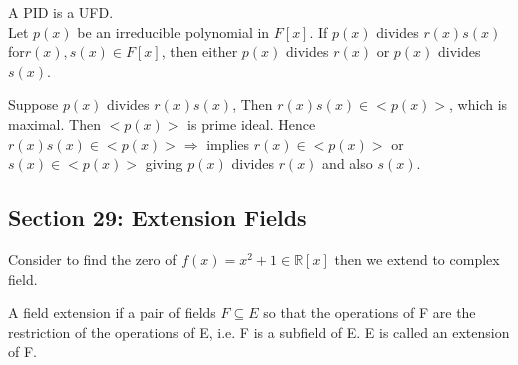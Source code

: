 \documentclass{article}
\newcommand\R{\ensuremath{\mathbb{R}}}
\begin{document}
\begin{theorem}
    A PID is a UFD.
\\ Let $p(x)$ be an irreducible polynomial in $F[x]$. If $p(x)$ divides $r(x)s(x)$ for$r(x), s(x) \in F[x]$, then either $p(x)$ divides $r(x)$ or $p(x)$ divides $s(x)$.
\end{theorem}

\begin{Proof}
    Suppose $p(x)$ divides $r(x)s(x)$, Then $r(x)s(x)\in <p(x)>$, which is maximal. Then $<p(x)>$ is prime ideal. Hence $r(x)s(x)\in <p(x)> \Rightarrow $ implies $r(x) \in <p(x)>$ or $s(x) \in <p(x)>$ giving $p(x)$ divides $r(x)$ and also $s(x)$. 
\end{Proof}

\newpage
\subsection{Section 29: Extension Fields}
\begin{note}
    Consider to find the zero of $f(x) = x^2 + 1 \in \R[x] $ then we extend to complex field.
\end{note}
\begin{Def}
    A field extension if a pair of fields $F\subseteq E$ so that the operations of F are the restriction of the operations of E, i.e. F is a subfield of E. E is called an extension of F.
\end{Def}
\end{document}
